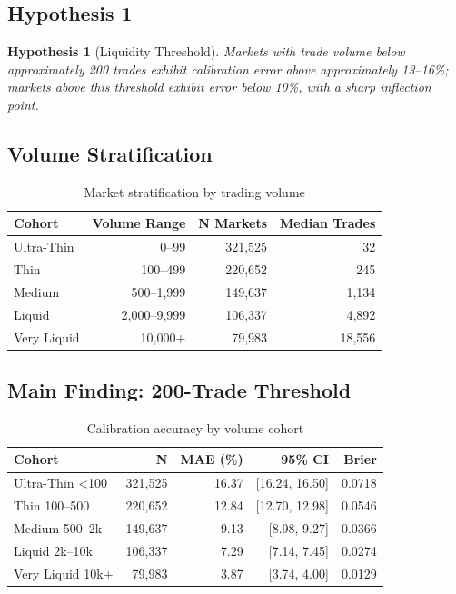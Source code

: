 \documentclass[a4paper,11pt]{article}
\theoremstyle{plain}
\newtheorem{hypothesis}[section]{Hypothesis}
\theoremstyle{definition}
\begin{document}
\subsection{Hypothesis 1}

\begin{hypothesis}[Liquidity Threshold]
Markets with trade volume below approximately 200 trades exhibit calibration error above approximately 13--16\%; markets above this threshold exhibit error below 10\%, with a sharp inflection point.
\end{hypothesis}

\subsection{Volume Stratification}

\begin{table}[h]
\centering
\caption{Market stratification by trading volume}
\label{tab:vol_cohorts}
\small
\begin{tabular}{lrrr}
\toprule
Cohort & Volume Range & N Markets & Median Trades \\
\midrule
Ultra-Thin & 0--99 & 321,525 & 32 \\
Thin & 100--499 & 220,652 & 245 \\
Medium & 500--1,999 & 149,637 & 1,134 \\
Liquid & 2,000--9,999 & 106,337 & 4,892 \\
Very Liquid & 10,000+ & 79,983 & 18,556 \\
\bottomrule
\end{tabular}
\end{table}

\subsection{Main Finding: 200-Trade Threshold}

\begin{table}[h]
\centering
\caption{Calibration accuracy by volume cohort}
\label{tab:vol_accuracy}
\small
\begin{tabular}{lrrrr}
\toprule
Cohort & N & MAE (\%) & 95\% CI & Brier \\
\midrule
Ultra-Thin <100 & 321,525 & 16.37 & [16.24, 16.50] & 0.0718 \\
Thin 100--500 & 220,652 & 12.84 & [12.70, 12.98] & 0.0546 \\
Medium 500--2k & 149,637 & 9.13 & [8.98, 9.27] & 0.0366 \\
Liquid 2k--10k & 106,337 & 7.29 & [7.14, 7.45] & 0.0274 \\
Very Liquid 10k+ & 79,983 & 3.87 & [3.74, 4.00] & 0.0129 \\
\bottomrule
\end{tabular}
\end{table}
\end{document}
